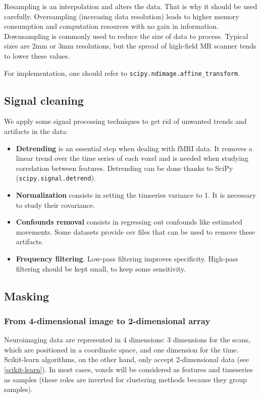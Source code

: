 \documentclass{frontiersSCNS} %
\begin{document}
Resampling is an interpolation and alters the data. That is
why it should be used carefully. Oversampling (increasing
data resolution) leads to higher memory consumption and computation resources
with no gain in information.
Downsampling is commonly used to reduce the size of data to process.
Typical sizes are 2mm or 3mm resolutions, but the spread of high-field MR
scanner tends to lower these values.

For implementation, one should refer to \texttt{scipy.ndimage.affine\_transform}.

\subsection{Signal cleaning}

We apply some signal processing techniques to get rid of unwanted trends and
artifacts in the data:

\begin{itemize}
    \item{\bf Detrending} is an essential step when dealing with fMRI data. It removes a
linear trend over the time series of each
voxel and is needed when studying correlation between
features. Detrending can be done thanks to SciPy (\texttt{scipy.signal.detrend}).\\
\item{\bf Normalization} consists in setting the timseries variance to 1. It is
    necessary to study their covariance.\\
\item{\bf Confounds removal} consists in regressing out confounds like
estimated movements. Some datasets provide csv files that can be used to remove
these artifacts.\\
\item{\bf Frequency filtering}. Low-pass filtering improves specificity.
High-pass filtering should be kept small, to keep some sensitivity.
\end{itemize}

\subsection{Masking}

\subsubsection{From 4-dimensional image to 2-dimensional array}

Neuroimaging data are represented in 4 dimensions: 3 dimensions for the scans,
which are positioned in a coordinate space, and one dimension for the time.
Scikit-learn algorithms, on the other hand, only accept 2-dimensional data (see
\ref{scikit-learn}).
In most
cases, voxels will be considered as features and timeseries as samples (these
roles are inverted for clustering methods because they group samples).\\
\end{document}

